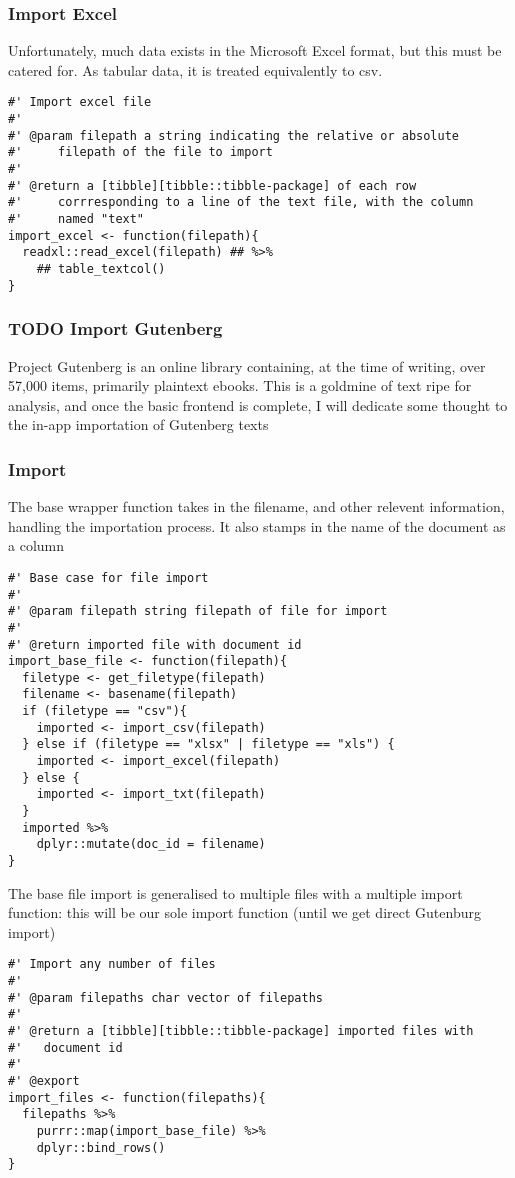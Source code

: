 \documentclass[a4paper, 11pt]{article}
\begin{document}
\subsubsection{Import Excel}
\label{sec:org3fd0d24}
Unfortunately, much data exists in the Microsoft Excel format, but
this must be catered for. As tabular data, it is treated equivalently
to csv.
\begin{verbatim}
#' Import excel file
#'
#' @param filepath a string indicating the relative or absolute
#'     filepath of the file to import
#'
#' @return a [tibble][tibble::tibble-package] of each row
#'     corrresponding to a line of the text file, with the column
#'     named "text"
import_excel <- function(filepath){
  readxl::read_excel(filepath) ## %>%
    ## table_textcol()
}
\end{verbatim}
\subsubsection{{\bfseries\sffamily TODO} Import Gutenberg}
\label{sec:org4fe4185}
Project Gutenberg is an online library containing, at the time of
writing, over 57,000 items, primarily plaintext ebooks. This is a
goldmine of text ripe for analysis, and once the basic frontend is
complete, I will dedicate some thought to the in-app importation of
Gutenberg texts
\subsubsection{Import}
\label{sec:org3dd969d}
The base wrapper function takes in the filename, and other relevent
information, handling the importation process. It also stamps in the
name of the document as a column
\begin{verbatim}
#' Base case for file import
#'
#' @param filepath string filepath of file for import
#'
#' @return imported file with document id
import_base_file <- function(filepath){
  filetype <- get_filetype(filepath)
  filename <- basename(filepath)
  if (filetype == "csv"){
    imported <- import_csv(filepath)
  } else if (filetype == "xlsx" | filetype == "xls") {
    imported <- import_excel(filepath)
  } else {
    imported <- import_txt(filepath)
  }
  imported %>%
    dplyr::mutate(doc_id = filename)
}
\end{verbatim}
The base file import is generalised to multiple files with a multiple
import function: this will be our sole import function (until we get
direct Gutenburg import)
\begin{verbatim}
#' Import any number of files
#'
#' @param filepaths char vector of filepaths
#'
#' @return a [tibble][tibble::tibble-package] imported files with
#'   document id
#' 
#' @export
import_files <- function(filepaths){
  filepaths %>%
    purrr::map(import_base_file) %>%
    dplyr::bind_rows()
}
\end{verbatim}
\end{document}
